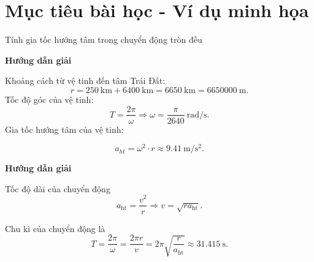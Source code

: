 \section{Mục tiêu bài học - Ví dụ minh họa}
\begin{dang}{Tính gia tốc hướng tâm trong chuyển động tròn đều}
	
	{	\begin{center}
			\textbf{Hướng dẫn giải}
		\end{center}
		
		Khoảng cách từ vệ tinh đến tâm Trái Đất: 
		$$r=250\ \text{km}+6400\ \text{km} =6650\ \text{km}=6650000\ \text{m}. $$
		Tốc độ góc của vệ tinh:
		$$T=\frac{2\pi}{\omega} \Rightarrow \omega = \frac{\pi}{2640}\ \text{rad/s}.$$ 
		Gia tốc hướng tâm của vệ tinh: 
		
		$$a_{ht}=\omega^2 \cdot r \approx \SI{9,41}{ \meter/\second^2}.$$ 
		
	}
	
	{	\begin{center}
			\textbf{Hướng dẫn giải}
		\end{center}
		
		Tốc độ dài của chuyển động
		$$a_\text{ht} =\dfrac{v^2}{r} \Rightarrow v =\sqrt {ra_\text{ht}}.$$
		
		Chu kì của chuyển động là
		$$T =\dfrac{2\pi}{\omega} = \dfrac{2\pi r}{v} = 2\pi \sqrt{\dfrac{r}{a_\text{ht}}} \approx \SI{31.415}{\second}.$$
		
	}
\end{dang}

